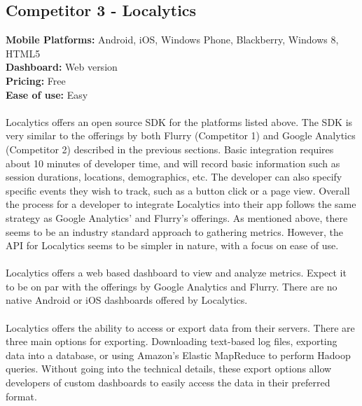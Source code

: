 \documentclass[12pt,oneside,letterpaper]{article}
\begin{document}
\subsection{Competitor 3 - Localytics}
\textbf{Mobile Platforms:} Android, iOS, Windows Phone, Blackberry, Windows 8, HTML5\\
\textbf{Dashboard:} Web version\\
\textbf{Pricing:} Free\\
\textbf{Ease of use:} Easy\\
\\
Localytics offers an open source SDK for the platforms listed above. The SDK is very similar to the offerings by both Flurry (Competitor 1) and Google Analytics (Competitor 2) described in the previous sections. Basic integration requires about 10 minutes of developer time, and will record basic information such as session durations, locations, demographics, etc. The developer can also specify specific events they wish to track, such as a button click or a page view. Overall the process for a developer to integrate Localytics into their app follows the same strategy as Google Analytics' and Flurry's offerings. As mentioned above, there seems to be an industry standard approach to gathering metrics. However, the API for Localytics seems to be simpler in nature, with a focus on ease of use.\\\\
Localytics offers a web based dashboard to view and analyze metrics. Expect it to be on par with the offerings by Google Analytics and Flurry. There are no native Android or iOS dashboards offered by Localytics.\\\\
Localytics offers the ability to access or export data from their servers. There are three main options for exporting. Downloading text-based log files, exporting data into a database, or using Amazon's Elastic MapReduce to perform Hadoop queries. Without going into the technical details, these export options allow developers of custom dashboards to easily access the data in their preferred format.\\\\
\end{document}
